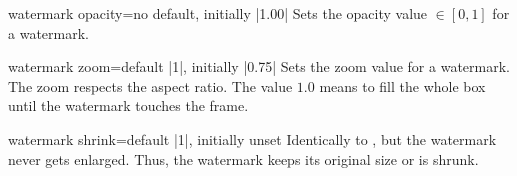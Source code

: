 \clearpage
\begin{docTcbKey}{watermark opacity}{=}{no default, initially |1.00|}
  Sets the opacity value $\in[0,1]$ for a watermark.
\begin{dispExample}

\begin{tcolorbox}[title=Opacity 1.00,watermark opacity=1.00]
\lipsum[2]
\end{tcolorbox}\hfill%
\begin{tcolorbox}[title=Opacity 0.50,watermark opacity=0.50]
\lipsum[2]
\end{tcolorbox}%
\end{dispExample}
\end{docTcbKey}

\enlargethispage*{1cm}

\begin{docTcbKey}[][doc updated=2022-07-21]{watermark zoom}{=}{default |1|, initially |0.75|}
  Sets the zoom value for a watermark. The zoom respects the aspect ratio.
  The value $1.0$ means to fill the whole box until the watermark touches the frame.
\begin{dispExample}

\begin{tcolorbox}[title=Zoom 1.0,watermark zoom=1.0]
\lipsum[2]
\end{tcolorbox}\hfill%
\begin{tcolorbox}[title=Zoom 0.5,watermark zoom=0.5]
\lipsum[2]
\end{tcolorbox}%
\end{dispExample}
\end{docTcbKey}

\clearpage

\begin{docTcbKey}[][doc updated=2022-07-21]{watermark shrink}{=}{default |1|, initially unset}
  Identically to , but the watermark
  never gets enlarged. Thus, the watermark keeps its original size or is shrunk.
\end{docTcbKey}


